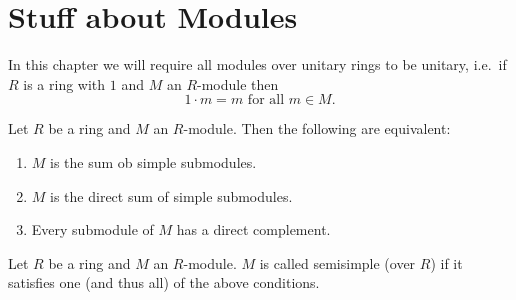 \chapter{Stuff about Modules}
In this chapter we will require all modules over unitary rings to be unitary, i.e.\ if $R$ is a ring with $1$ and $M$ an $R$-module then
\[
 1 \cdot m = m \text{ for all } m \in M.
\]



\begin{prop}\label{prop: characterisation semisimple modules}
 Let $R$ be a ring and $M$ an $R$-module. Then the following are equivalent:
 \begin{enumerate}[label=\emph{\roman*})]
  \item
  $M$ is the sum ob simple submodules. \label{enum: sum of simple}
  \item
  $M$ is the direct sum of simple submodules. \label{enum: direct sum of simple}
  \item
  Every submodule of $M$ has a direct complement. \label{enum: direct complements}
 \end{enumerate}
\end{prop}


\begin{defi}
 Let $R$ be a ring and $M$ an $R$-module. $M$ is called semisimple (over $R$) if it satisfies one (and thus all) of the above conditions.
\end{defi}


